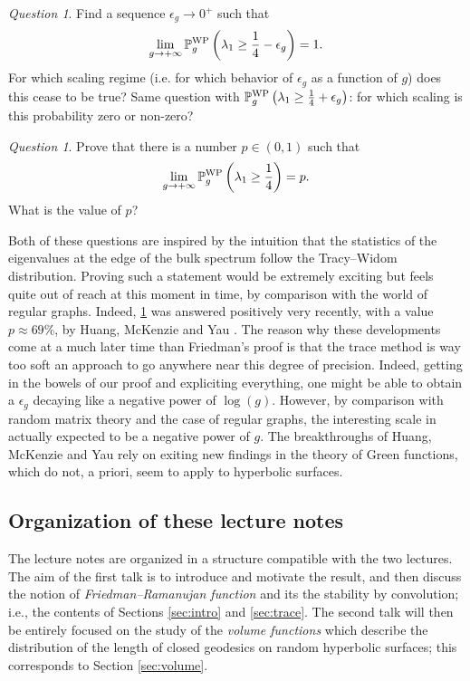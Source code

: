 \documentclass[12pt,twoside]{article}
\theoremstyle{theorem}
\theoremstyle{remark}
\newtheorem{ques}[thm]{Question}
\theoremstyle{definition}
\theoremstyle{example}
\newcommand{\1}[1]{\mathds{1}_{#1}}
\newcommand{\Pwpo}{\mathbb{P}_g^{\mathrm{\scriptsize{WP}}}}
\newcommand{\Pwp}[1]{\Pwpo \left( #1 \right)}
\begin{document}
\begin{ques}
  Find a sequence $\epsilon_g \rightarrow 0^+$ such that
  \begin{equation}
  \lim_{g \rightarrow + \infty} \Pwp{\lambda_1 \geq \frac 14 - \epsilon_g}=1.    
  \end{equation}
  For which scaling regime (i.e. for which behavior of $\epsilon_g$ as a function of $g$) does this
  cease to be true?  Same question with $\Pwp{\lambda_1 \geq \frac 14 + \epsilon_g}$: for which
  scaling is this probability zero or non-zero?
\end{ques}

\begin{ques}
  \label{ques:TW}
  Prove that there is a number $p \in (0,1)$ such that
  \begin{equation}
    \label{eq:lambda14}
    \lim_{g \rightarrow + \infty} \Pwp{\lambda_1 \geq \frac 14} = p.
  \end{equation}
  What is the value of $p$?
\end{ques}

Both of these questions are inspired by the intuition that the statistics of the eigenvalues at the
edge of the bulk spectrum follow the Tracy--Widom distribution. Proving such a statement would be
extremely exciting but feels quite out of reach at this moment in time, by comparison with the world
of regular graphs. Indeed, \cref{ques:TW} was answered positively very recently, with a value
$p \approx 69\%$, by Huang, McKenzie and Yau \cite{huang2025}. The reason why these developments
come at a much later time than Friedman's proof is that the trace method is way too soft an approach
to go anywhere near this degree of precision.  Indeed, getting in the bowels of our proof and
expliciting everything, one might be able to obtain a $\epsilon_g$ decaying like a negative power of
$\log(g)$. However, by comparison with random matrix theory and the case of regular graphs, the
interesting scale in actually expected to be a negative power of $g$. The breakthroughs of Huang,
McKenzie and Yau rely on exiting new findings in the theory of Green functions, which do not, a
priori, seem to apply to hyperbolic surfaces.

\subsection{Organization of these lecture notes}

The lecture notes are organized in a structure compatible with the two lectures.  The aim of the
first talk is to introduce and motivate the result, and then discuss the notion of
\emph{Friedman--Ramanujan function} and its the stability by convolution; i.e., the contents of
Sections \ref{sec:intro} and \ref{sec:trace}. The second talk will then be entirely focused on the
study of the \emph{volume functions} which describe the distribution of the length of closed
geodesics on random hyperbolic surfaces; this corresponds to Section \ref{sec:volume}. %
\end{document}
